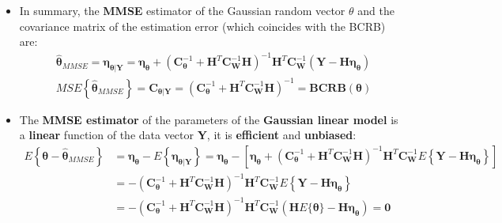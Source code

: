 \begin{itemize}
\item In summary, the \textbf{MMSE} estimator of the Gaussian random vector \(\theta\) and the covariance matrix of the estimation error (which coincides with the BCRB) are:
\begin{align*}
&\hat{\boldsymbol{\theta}}_{MMSE} = \boldsymbol{\eta}_{\boldsymbol{\theta}|\mathbf{Y}} = \boldsymbol{\eta}_{\boldsymbol{\theta}} + \left(\mathbf{C}_{\boldsymbol{\theta}}^{-1} + \mathbf{H}^{T} \mathbf{C}_{\mathbf{W}}^{-1} \mathbf{H}\right)^{-1} \mathbf{H}^{T} \mathbf{C}_{\mathbf{W}}^{-1} \left(\mathbf{Y} - \mathbf{H} \boldsymbol{\eta}_{\boldsymbol{\theta}}\right) \\[1em]
&MSE\left\{\hat{\boldsymbol{\theta}}_{MMSE}\right\} = \mathbf{C}_{\boldsymbol{\theta}|\mathbf{Y}} = \left(\mathbf{C}_{\boldsymbol{\theta}}^{-1} + \mathbf{H}^{T} \mathbf{C}_{\mathbf{W}}^{-1} \mathbf{H}\right)^{-1} = \mathbf{BCRB}(\boldsymbol{\theta})
\end{align*}
\item The \textbf{MMSE estimator} of the parameters of the \textbf{Gaussian linear model} is a \textbf{linear} function of the data vector \textbf{Y}, it is \textbf{efficient} and \textbf{unbiased}: 
\begin{align*}
E\left\{\boldsymbol{\theta} - \hat{\boldsymbol{\theta}}_{MMSE}\right\} &= \boldsymbol{\eta}_{\boldsymbol{\theta}} - E\left\{\boldsymbol{\eta}_{\boldsymbol{\theta}|\mathbf{Y}}\right\} = \boldsymbol{\eta}_{\boldsymbol{\theta}} - \left[\boldsymbol{\eta}_{\boldsymbol{\theta}} + \left(\mathbf{C}_{\boldsymbol{\theta}}^{-1} + \mathbf{H}^{T} \mathbf{C}_{\mathbf{W}}^{-1} \mathbf{H}\right)^{-1} \mathbf{H}^{T} \mathbf{C}_{\mathbf{W}}^{-1} E\left\{\mathbf{Y} - \mathbf{H} \boldsymbol{\eta}_{\boldsymbol{\theta}}\right\}\right] \\
&= - \left(\mathbf{C}_{\boldsymbol{\theta}}^{-1} + \mathbf{H}^{T} \mathbf{C}_{\mathbf{W}}^{-1} \mathbf{H}\right)^{-1} \mathbf{H}^{T} \mathbf{C}_{\mathbf{W}}^{-1} E\left\{\mathbf{Y} - \mathbf{H} \boldsymbol{\eta}_{\boldsymbol{\theta}}\right\} \\
&= - \left(\mathbf{C}_{\boldsymbol{\theta}}^{-1} + \mathbf{H}^{T} \mathbf{C}_{\mathbf{W}}^{-1} \mathbf{H}\right)^{-1} \mathbf{H}^{T} \mathbf{C}_{\mathbf{W}}^{-1} \left(\mathbf{H} E\{\boldsymbol{\theta}\} - \mathbf{H} \boldsymbol{\eta}_{\boldsymbol{\theta}}\right)= \mathbf{0}
\end{align*}
\end{itemize}

